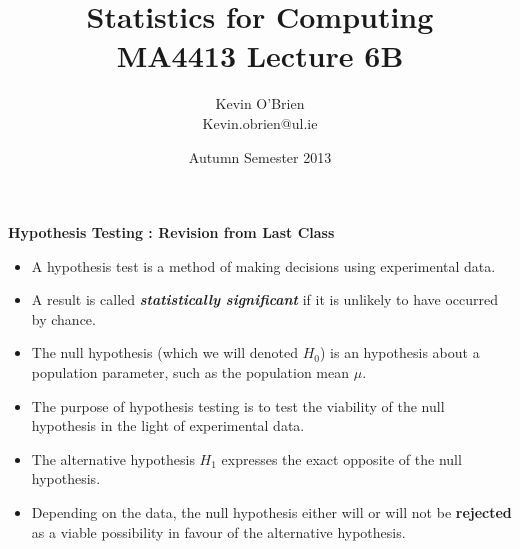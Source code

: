\documentclass[a4]{beamer}
\title[MA4413]{Statistics for Computing \\ {\normalsize MA4413 Lecture 6B}}
\author[Kevin O'Brien]{Kevin O'Brien \\ {\scriptsize Kevin.obrien@ul.ie}}
\date{Autumn Semester 2013}
\institute[Maths \& Stats]{Dept. of Mathematics \& Statistics, \\ University \textit{of} Limerick}
\begin{document}

\titlepage






\noindent \textbf{Hypothesis Testing : Revision from Last Class}
\large
\begin{itemize} \item
A hypothesis test is a method of making decisions using experimental data. \item A result is called \textbf{\emph{statistically significant}} if it is unlikely to have occurred by chance.



%


%
\item The null hypothesis (which we will denoted $H_0$) is an hypothesis about a population parameter, such as the population mean $\mu$. \item The purpose of hypothesis testing is to test the viability of the null hypothesis in the light of experimental data. \item The alternative hypothesis $H_1$ expresses the exact opposite of the null hypothesis. \item Depending on the data, the null hypothesis either will or will not be \textbf{rejected} as a viable possibility in favour of the alternative hypothesis.
\end{itemize}
\end{document}
